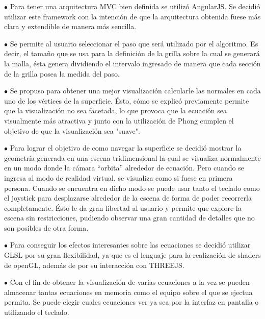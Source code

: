 \documentclass[12pt]{article}
\begin{document}
$\bullet$ Para tener una arquitectura MVC bien definida se utilizó AngularJS. Se decidió utilizar este framework con la intención de que la arquitectura obtenida fuese más clara y extendible de manera más sencilla.

$\bullet$ Se permite al usuario seleccionar el paso que será utilizado por el algoritmo. Es decir, el tamaño que se usa para la definición de la grilla sobre la cual se generará la malla, ésta genera dividiendo el intervalo ingresado de manera que cada sección de la grilla posea la medida del paso. 

$\bullet$ Se propuso para obtener una mejor visualización calcularle las normales en cada uno  de los vértices de la superficie. Ésto, cómo se explicó previamente permite que la visualización no sea facetada, lo que provoca que la ecuación sea visualmente más atractiva y junto con la utilización de Phong cumplen el objetivo de que la visualización sea "suave". 

$\bullet$ Para lograr el objetivo de como navegar la superficie se decidió mostrar la geometría generada en una escena tridimensional la cual se visualiza normalmente en un modo donde la cámara “orbita” alrededor de ecuación. Pero cuando se ingresa al modo de realidad virtual, se visualiza como si fuese en primera persona. Cuando se encuentra en dicho modo se puede usar tanto el teclado como el joystick para desplazarse alrededor de la escena de forma de poder recorrerla completamente. Ésto le da gran libertad al usuario y permite que explore la escena sin restricciones, pudiendo observar una gran cantidad de detalles que no son posibles de otra forma.


$\bullet$ Para conseguir los efectos interesantes sobre las ecuaciones se decidió utilizar GLSL por su gran flexibilidad, ya que es el lenguaje para la realización de shaders de openGL, además de por su interacción con THREEJS. 

$\bullet$ Con el fin de obtener la visualización de varias ecuaciones a la vez se pueden almacenar tantas ecuaciones en memoria como el equipo sobre el que se ejectua permita. Se puede elegir cuales ecuaciones ver ya sea por la interfaz en pantalla o utilizando el teclado.
\end{document}
